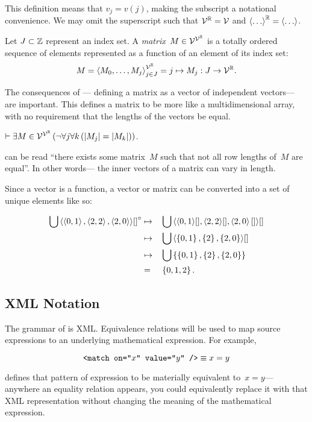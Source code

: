 This definition means that $v_j = v(j)$,
  making the subscript a notational convenience.
We may omit the superscript such that $\mathcal{V}^{\mathbb{R}}=\mathcal{V}$
  and $\left\langle\ldots\right\rangle^{\mathbb{R}}=\left\langle\ldots\right\rangle$.

\begin{definition}[Matrix]
  Let $J\subset\mathbb{Z}$ represent an index set.
  A \emph{matrix}~$M\in\mathcal{V}^{\mathcal{V}^{\mathbb{R}}}$ is a totally ordered sequence of
   elements represented as a function of an element of its index set:
  \begin{equation}
    M = \left\langle M_0,\ldots,M_j\right\rangle^{\mathcal{V}^{\mathbb{R}}}_{j\in J}
      = j \mapsto M_j : J \rightarrow \mathcal{V}^{\mathbb{R}}.
  \end{equation}
\end{definition}

The consequences of ---%
  defining a matrix as a vector of independent vectors---%
  are important.
This defines a matrix to be more like a multidimensional array,
  with no requirement that the lengths of the vectors be equal.

\begin{corollary}
  $\infer \Exists{M\in\Matrices}{\neg\Forall*{j}{\Forall{k}{\len{M_j} = \len{M_k}}}}$.
\end{corollary}

 can be read ``there exists some matrix~$M$ such that
  not all row lengths of~$M$ are equal''.
In other words---%
  the inner vectors of a matrix can vary in length.

Since a vector is a function,
  a vector or matrix can be converted into a set of unique elements like so:

\begin{alignat*}{2}
  \bigcup\left\langle\left\langle0,1\right\rangle,\left\langle2,2\right\rangle,\left\langle2,0\right\rangle\right\rangle\!{[]}^\circ
    &\mapsto &&\bigcup\left\langle\left\langle0,1\right\rangle\![],\left\langle2,2\right\rangle\![],\left\langle2,0\right\rangle[]\right\rangle\![] \\
    &\mapsto &&\bigcup\left\langle\left\{0,1\right\},\left\{2\right\},\left\{2,0\right\}\right\rangle\![] \\
    &\mapsto &&\bigcup\left\{\left\{0,1\right\},\left\{2\right\},\left\{2,0\right\}\right\} \\
    &=       &&\left\{0,1,2\right\}.
\end{alignat*}


\subsection{XML Notation}
The grammar of \tame{} is XML.
Equivalence relations will be used to map source expressions to an
  underlying mathematical expression.
For example,

\begin{equation*}
  \texttt{<match on="$x$" value="$y$" />} \equiv x = y
\end{equation*}

\noindent
defines that pattern of  expression to be materially
  equivalent to~$x=y$---%
    anywhere an equality relation appears,
      you could equivalently replace it with that XML representation without
        changing the meaning of the mathematical expression.
